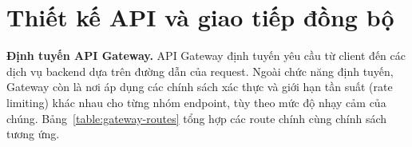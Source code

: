 \documentclass[../DoAn.tex]{subfiles}
\begin{document}
{%


\section{Thiết kế API và giao tiếp đồng bộ}
\label{section:4.6}

\textbf{Định tuyến API Gateway.} API Gateway định tuyến yêu cầu từ client đến các dịch vụ
backend dựa trên đường dẫn của request. Ngoài chức năng định tuyến, Gateway còn là nơi áp dụng
các chính sách xác thực và giới hạn tần suất (rate limiting) khác nhau cho từng nhóm endpoint,
tùy theo mức độ nhạy cảm của chúng. Bảng~\ref{table:gateway-routes} tổng hợp các route chính
cùng chính sách tương ứng.

}
\end{document}
